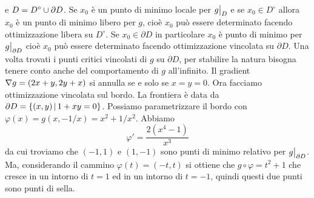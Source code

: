 \documentclass[a4paper]{article}
\begin{document}
\begin{snippetexercise}{}
    e \(D = D^\circ \cup \partial D\). Se \(x_0\) è un punto di minimo locale per
    \(\restr{g}{D}\) e se \(x_0 \in D^\circ\) allora \(x_0\) è un punto di minimo
    libero per \(g\), cioè \(x_0\) può essere determinato facendo ottimizzazione libera
    su \(D^\circ\).
    Se \(x_0 \in \partial D\) in particolare \(x_0\) è punto di minimo per \(\restr{g}{\partial D}\) cioè
    \(x_0\) può essere determinato facendo ottimizzazione vincolata su \(\partial D\).
    Una volta trovati i punti critici vincolati di \(g\) su \(\partial D\),
    per stabilire la natura bisogna tenere conto anche del comportamento di \(g\)
    all'infinito.
    Il gradient \(\nabla g = (2x + y, 2y + x)\) si annulla se e solo se
    \(x = y = 0\).
    Ora facciamo ottimizzazione vincolata sul bordo.
    La frontiera è data da \(\partial D = \{(x,y) \,|\, 1 + xy = 0\}\).
    Possiamo parametrizzare il bordo con \(\varphi(x) = g(x, -1/x) = x^2 + 1/x^2\).
    Abbiamo
    \[
        \varphi' = \frac{2(x^4 - 1)}{x^3}
    \]
    da cui troviamo che \((-1, 1)\) e \((1, -1)\) sono punti di minimo relativo
    per \(\restr{g}{\partial D}\).
    Ma, considerando il cammino \(\varphi(t) = (-t, t)\) si ottiene che
    \(g \circ \varphi = t^2 + 1\) che cresce in un intorno di \(t=1\) ed in un intorno
    di \(t=-1\), quindi questi due punti sono punti di sella.
\end{snippetexercise}
\end{document}
